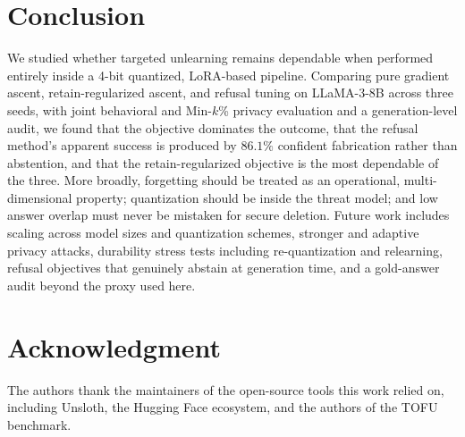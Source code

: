 \documentclass[journal]{IEEEtran}
\begin{document}
\section{Conclusion}
\label{sec:conclusion}
We studied whether targeted unlearning remains dependable when performed entirely inside a 4-bit quantized, LoRA-based pipeline. Comparing pure gradient ascent, retain-regularized ascent, and refusal tuning on LLaMA-3-8B across three seeds, with joint behavioral and Min-$k$\% privacy evaluation and a generation-level audit, we found that the objective dominates the outcome, that the refusal method's apparent success is produced by $86.1\%$ confident fabrication rather than abstention, and that the retain-regularized objective is the most dependable of the three. More broadly, forgetting should be treated as an operational, multi-dimensional property; quantization should be inside the threat model; and low answer overlap must never be mistaken for secure deletion. Future work includes scaling across model sizes and quantization schemes, stronger and adaptive privacy attacks, durability stress tests including re-quantization and relearning, refusal objectives that genuinely abstain at generation time, and a gold-answer audit beyond the proxy used here.

\section*{Acknowledgment}
The authors thank the maintainers of the open-source tools this work relied on, including Unsloth, the Hugging Face ecosystem, and the authors of the TOFU benchmark.
\end{document}
